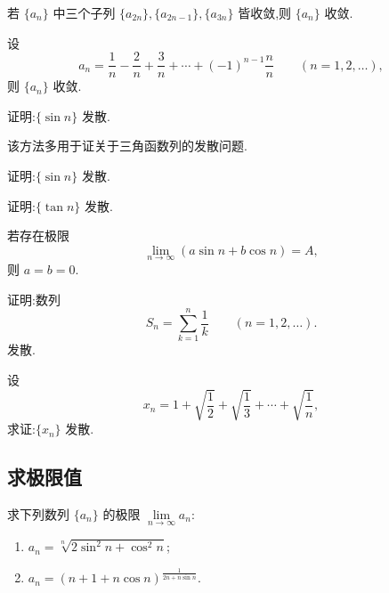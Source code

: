 \documentclass[../数学分析培优讲义.tex]{subfiles}
\begin{document}
\begin{example}
若 $\{a_n\}$ 中三个子列 $\{a_{2n}\},\{a_{2n-1}\},\{a_{3n}\}$ 皆收敛,则 $\{a_n\}$ 收敛.
\end{example}
\exampleblank

\begin{example}
设
\[
a_n=\dfrac{1}{n}-\dfrac{2}{n}+\dfrac{3}{n}+\cdots+(-1)^{n-1}\dfrac{n}{n}
\qquad(n=1,2,\ldots),
\]
则 $\{a_n\}$ 收敛.
\end{example}
\exampleblank

\begin{example}
证明:$\{\sin n\}$ 发散.
\end{example}
\exampleblank


\newpage


该方法多用于证关于三角函数列的发散问题.

\begin{example}
证明:$\{\sin n\}$ 发散.
\end{example}
\exampleblank

\begin{example}
证明:$\{\tan n\}$ 发散.
\end{example}
\exampleblank

\begin{example}
若存在极限
\[
\lim\limits_{n\to\infty}(a\sin n+b\cos n)=A,
\]
则 $a=b=0$.
\end{example}
\exampleblank


\newpage


\begin{example}
证明:数列
\[
S_n=\sum\limits_{k=1}^n\dfrac{1}{k}\qquad(n=1,2,\ldots).
\]
发散.
\end{example}
\exampleblank

\begin{example}
设
\[
x_n=1+\sqrt{\dfrac{1}{2}}+\sqrt{\dfrac{1}{3}}+\cdots+\sqrt{\dfrac{1}{n}},
\]
求证:$\{x_n\}$ 发散.
\end{example}
\exampleblank


\newpage

\subsection{求极限值}



\begin{example}
求下列数列 $\{a_n\}$ 的极限 $\displaystyle \lim\limits_{n\to\infty}a_n$:
\begin{enumerate}[label=(\arabic*)]
  \item $\displaystyle a_n=\sqrt[n]{2\sin^2n+\cos^2n}$;
  \item $\displaystyle a_n=(n+1+n\cos n)^{\frac{1}{2n+n\sin n}}$.
\end{enumerate}
\end{example}
\exampleblank
\end{document}

